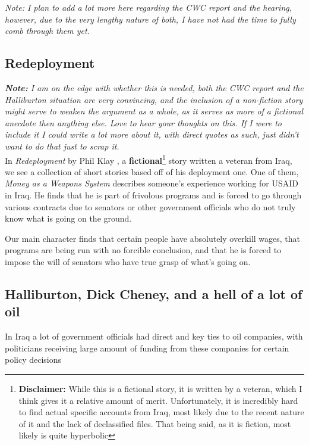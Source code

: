 \documentclass{article}
\begin{document}
        \textit{Note: I plan to add a lot more here regarding the CWC report and the hearing, however, due to the very lengthy nature of both, I have not had the time to fully comb through them yet. }

    \subsection{Redeployment}
        \begingroup     
            \centering
            \textit{\textbf{Note:} I am on the edge with whether this is needed, both the CWC report and the Halliburton situation are very convincing, and the inclusion of a non-fiction story might serve to weaken the argument as a whole, as it serves as more of a fictional anecdote then anything else. Love to hear your thoughts on this. If I were to include it I could write a lot more about it, with direct quotes as such, just didn't want to do that just to scrap it. }
        \endgroup\\[15pt]
        In \textit{Redeployment} by Phil Klay \parencite{Klay2014}, a \textbf{fictional}\footnote{\textbf{Disclaimer:} While this is a fictional story, it is written by a veteran, which I think gives it a relative amount of merit. Unfortunately, it is incredibly hard to find actual specific accounts from Iraq, most likely due to the recent nature of it and the lack of declassified files. That being said, as it is fiction, most likely is quite hyperbolic} story written a veteran from Iraq, we see a collection of short stories based off of his deployment one. One of them, \textit{Money as a Weapons System} describes someone's experience working for USAID in Iraq. He finds that he is part of frivolous programs and is forced to  go through various contracts due to senators or other government officials who do not truly know what is going on the ground. 

        Our main character finds that certain people have absolutely overkill wages, that programs are being run with no forcible conclusion, and that he is forced to impose the will of senators who have true grasp of what's going on. 

    \subsection{Halliburton, Dick Cheney, and a hell of a lot of oil}
        In Iraq a lot of government officials had direct and key ties to oil companies, with politicians receiving large amount of funding from these companies for certain policy decisions
\end{document}
